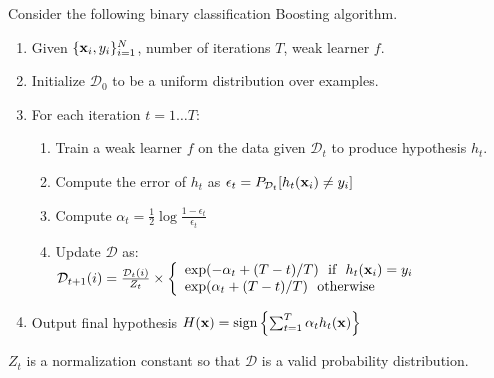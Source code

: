 \documentclass{article}
\newcommand{\vx}{{\bf x}}
\newcommand{\vxi}{{\bf x}_i}
\newcommand{\yi}{y_i}
\newcommand{\D}{\mathcal{D}}
\begin{document}
Consider the following binary classification Boosting algorithm.
\begin{enumerate}
	\item Given $\{\vxi, \yi\}_{i=1}^N$, number of iterations $T$, weak learner $f$.
	\item Initialize $\D_0$ to be a uniform distribution over examples.
	\item For each iteration $t = 1 \ldots T$:
		\begin{enumerate}
			\item Train a weak learner $f$ on the data given $\D_t$ to produce hypothesis $h_t$.
			\item Compute the error of $h_t$ as $\epsilon_t = P_{\D_t} [h_t(\vxi) \ne \yi]$
			\item Compute $\alpha_t = \frac{1}{2} \log \frac{1-\epsilon_t}{\epsilon_t}$
			\item Update $\D$ as:\\
				$\D_{t+1}(i) = \frac{\D_t(i)}{Z_t} \times \left\{
					\begin{array}{lr}
						\exp(-\alpha_t + (T-t) / T) ~~  \textrm{if} ~~ h_t(\vxi) = \yi  \\
						\exp(\alpha_t + (T-t) / T) ~~ \textrm{otherwise}
					\end{array}
					\right.$
		\end{enumerate}
	\item Output final hypothesis $H(\vx)=\textrm{sign} \left\{ \sum_{t=1}^T \alpha_t h_t(\vx) \right\}$
	\end{enumerate}

	$Z_t$ is a normalization constant so that $\D$ is a valid probability distribution.
\end{document}

